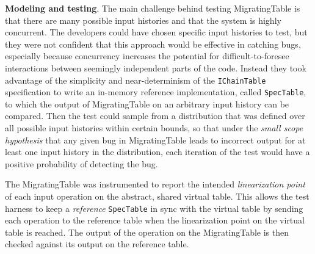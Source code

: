 

\textbf{Modeling and testing}.
The main challenge behind testing MigratingTable is that there are many possible input histories and that the system is highly concurrent. The developers could have chosen specific input histories to test, but they were not confident that this approach would be effective in catching bugs, especially because concurrency increases the potential for difficult-to-foresee interactions between seemingly independent parts of the code. Instead they took advantage of the simplicity and near-determinism of the \texttt{IChainTable} specification to write an in-memory reference implementation, called \texttt{SpecTable}, to which the output of MigratingTable on an arbitrary input history can be compared. Then the test could sample from a distribution that was defined over all possible input histories within certain bounds, so that under the \emph{small scope hypothesis} that any given bug in MigratingTable leads to incorrect output for at least one input history in the distribution, each iteration of the test would have a positive probability of detecting the bug.

The MigratingTable was instrumented to report the intended \emph{linearization point} of each input operation on the abstract, shared virtual table. This allows the test harness to keep a \emph{reference} \texttt{SpecTable} in sync with the virtual table by sending each operation to the reference table when the linearization point on the virtual table is reached. The output of the operation on the MigratingTable is then checked against its output on the reference table.


